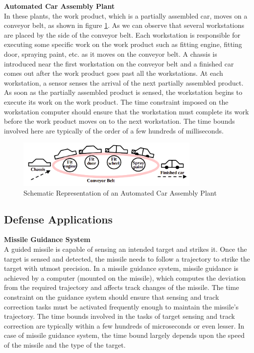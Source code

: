 \documentclass[12pt]{report}
\begin{document}
\noindent\textbf{Automated Car Assembly Plant}\\
In these plants, the work product, which is a partially assembled car, moves on a conveyor belt, as shown in figure \ref{fig:car}. As we can observe that several workstations are placed by the side of the conveyor belt. Each workstation is responsible for executing some specific work on the work product such as fitting engine, fitting door, spraying paint, etc. as it moves on the conveyor belt. A chassis is introduced near the first workstation on the conveyor belt and a finished car comes out after the work product goes past all the workstations. At each workstation, a sensor senses the arrival of the next partially assembled product. As soon as the partially assembled product is sensed, the workstation begins to execute its work on the work product. The time constraint imposed on the workstation computer should ensure that the workstation must complete its work before the work product moves on to the next workstation. The time bounds involved here are typically of the order of a few hundreds of milliseconds. 
\begin{figure}[h]
    \centering
    \includegraphics[width=0.8\textwidth]{images/car-assembly.png}
    \caption{Schematic Representation of an Automated Car Assembly Plant }
    \label{fig:car}
\end{figure}



\subsection{Defense Applications}
\noindent\textbf{Missile Guidance System}\\
A guided missile is capable of sensing an intended target and strikes it. Once the target is sensed and detected, the missile needs to follow a trajectory to strike the target with utmost precision. In a missile guidance system, missile guidance is achieved by a computer (mounted on the missile), which computes the deviation from the required trajectory and affects track changes of the missile. The time constraint on the guidance system should ensure that sensing and track correction tasks must be activated frequently enough to maintain the missile's trajectory. The time bounds involved in the tasks of target sensing and track correction are typically within a few hundreds of microseconds or even lesser. In case of missile guidance system, the time bound largely depends upon the speed of the missile and the type of the target. 
\end{document}
